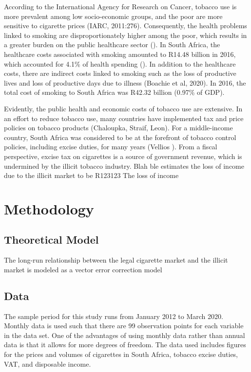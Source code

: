 \documentclass[12pt,afrikaans, english,letterpaper,oneside,
openany]{memoir}
\begin{document}
According to the International Agency for Research on Cancer, tobacco
use is more prevalent among low socio-economic groups, and the poor are
more sensitive to cigarette prices (IARC, 2011:276). Consequently, the
health problems linked to smoking are disproportionately higher among
the poor, which results in a greater burden on the public healthcare
sector (). In South Africa, the healthcare costs associated with smoking
amounted to R14.48 billion in 2016, which accounted for 4.1\% of health
spending (). In addition to the healthcare costs, there are indirect
costs linked to smoking such as the loss of productive lives and loss of
productive days due to illness (Boachie et al, 2020). In 2016, the total
cost of smoking to South Africa was R42.32 billion (0.97\% of GDP).

Evidently, the public health and economic costs of tobacco use are
extensive. In an effort to reduce tobacco use, many countries have
implemented tax and price policies on tobacco products (Chaloupka,
Straif, Leon). For a middle-income country, South Africa was considered
to be at the forefront of tobacco control policies, including excise
duties, for many years (Vellios ). From a fiscal perspective, excise tax
on cigarettes is a source of government revenue, which is undermined by
the illicit tobacco industry. Blah ble estimates the loss of income due
to the illicit market to be R123123 The loss of income

\hypertarget{methodology}{%
\chapter{\texorpdfstring{Methodology
\label{methodology}}{Methodology }}\label{methodology}}

\hypertarget{theoretical-model}{%
\section{\texorpdfstring{Theoretical Model
\label{Model}}{Theoretical Model }}\label{theoretical-model}}

The long-run relationship between the legal cigarette market and the
illicit market is modeled as a vector error correction model

\hypertarget{data}{%
\section{\texorpdfstring{Data \label{data}}{Data }}\label{data}}

The sample period for this study runs from January 2012 to March 2020.
Monthly data is used such that there are 99 observation points for each
variable in the data set. One of the advantages of using monthly data
rather than annual data is that it allows for more degrees of freedom.
The data used includes figures for the prices and volumes of cigarettes
in South Africa, tobacco excise duties, VAT, and disposable income.
\end{document}
